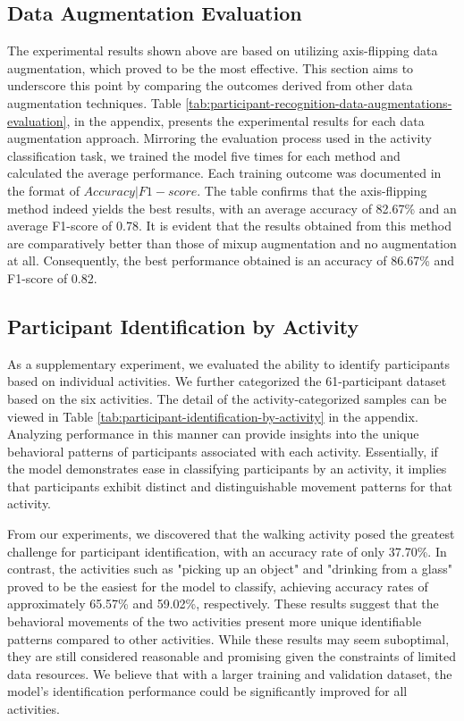 \documentclass{l4proj}
\begin{document}
\subsection{Data Augmentation Evaluation}
The experimental results shown above are based on utilizing axis-flipping data augmentation, which proved to be the most effective. This section aims to underscore this point by comparing the outcomes derived from other data augmentation techniques. Table \ref{tab:participant-recognition-data-augmentations-evaluation}, in the appendix, presents the experimental results for each data augmentation approach. Mirroring the evaluation process used in the activity classification task, we trained the model five times for each method and calculated the average performance. Each training outcome was documented in the format of $Accuracy | F1-score$. The table confirms that the axis-flipping method indeed yields the best results, with an average accuracy of 82.67\% and an average F1-score of 0.78. It is evident that the results obtained from this method are comparatively better than those of mixup augmentation and no augmentation at all. Consequently, the best performance obtained is an accuracy of 86.67\% and F1-score of 0.82.

\subsection{Participant Identification by Activity}
As a supplementary experiment, we evaluated the ability to identify participants based on individual activities. We further categorized the 61-participant dataset based on the six activities. The detail of the activity-categorized samples can be viewed in Table \ref{tab:participant-identification-by-activity} in the appendix. Analyzing performance in this manner can provide insights into the unique behavioral patterns of participants associated with each activity. Essentially, if the model demonstrates ease in classifying participants by an activity, it implies that participants exhibit distinct and distinguishable movement patterns for that activity.

From our experiments, we discovered that the walking activity posed the greatest challenge for participant identification, with an accuracy rate of only 37.70\%. In contrast, the activities such as "picking up an object" and "drinking from a glass" proved to be the easiest for the model to classify, achieving accuracy rates of approximately 65.57\% and 59.02\%, respectively. These results suggest that the behavioral movements of the two activities present more unique identifiable patterns compared to other activities. While these results may seem suboptimal, they are still considered reasonable and promising given the constraints of limited data resources. We believe that with a larger training and validation dataset, the model's identification performance could be significantly improved for all activities.
\end{document}
